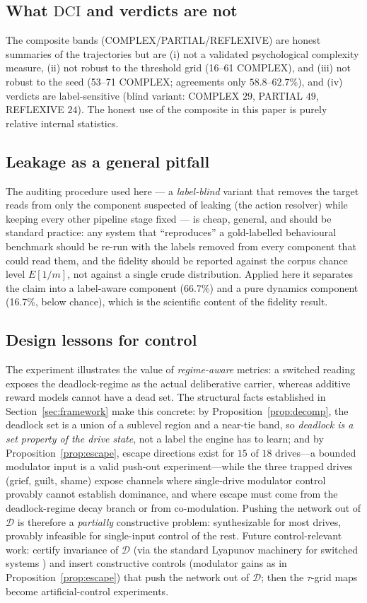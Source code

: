 \documentclass[journal]{IEEEtran}
\newcommand{\DD}{\mathcal{D}}
\newcommand{\DCI}{\mathrm{DCI}}
\newcommand{\pct}{\%}
\begin{document}
\subsection{What $\DCI$ and verdicts are not}
The composite bands (COMPLEX/PARTIAL/REFLEXIVE) are honest
summaries of the trajectories but are (i) not a validated
psychological complexity measure, (ii) not robust to the threshold grid
(16--61 COMPLEX), and (iii) not robust to the seed (53--71 COMPLEX;
agreements only $58.8$--$62.7\pct$), and (iv) verdicts are
label-sensitive (blind variant: COMPLEX $29$, PARTIAL $49$,
REFLEXIVE $24$). The honest use of the composite in
this paper is purely relative internal statistics.

\subsection{Leakage as a general pitfall}
The auditing procedure used here --- a \emph{label-blind} variant that
removes the target reads from only the component suspected of leaking
(the action resolver) while keeping every other pipeline stage fixed ---
is cheap, general, and should be standard practice: any system that
``reproduces'' a gold-labelled behavioural benchmark should be re-run
with the labels removed from every component that could read them, and
the fidelity should be reported against the corpus chance level
$E[1/m]$, not against a single crude distribution. Applied here it
separates the claim into a label-aware component (66.7\pct) and a pure
dynamics component (16.7\pct, below chance), which is the scientific
content of the fidelity result.

\subsection{Design lessons for control}
The experiment illustrates the value of \emph{regime-aware}
metrics: a switched reading exposes the deadlock-regime as the actual
deliberative carrier, whereas additive reward models cannot have a dead
set. The structural facts established in Section~\ref{sec:framework}
make this concrete: by Proposition~\ref{prop:decomp}, the deadlock set
is a union of a sublevel region and a near-tie band, so
\emph{deadlock is a set property of the drive state}, not a label the
engine has to learn; and by Proposition~\ref{prop:escape}, escape
directions exist for $15$ of $18$ drives---a bounded modulator input
is a valid push-out experiment---while the three trapped drives
(grief, guilt, shame) expose channels where single-drive
modulator control provably cannot establish dominance, and where
escape must come from the deadlock-regime decay branch or from
co-modulation. Pushing the network out of $\DD$ is therefore a
\emph{partially} constructive problem: synthesizable for most drives,
provably infeasible for single-input control of the rest. Future
control-relevant work: certify invariance of $\DD$ (via the standard
Lyapunov machinery for switched systems
\cite{liberzon2003,khalil2002,johansson1998,branicky1998,goebel2012}) and
insert constructive controls (modulator gains as in
Proposition~\ref{prop:escape}) that push the network out of $\DD$;
then the $\tau$-grid maps become artificial-control experiments.
\end{document}
